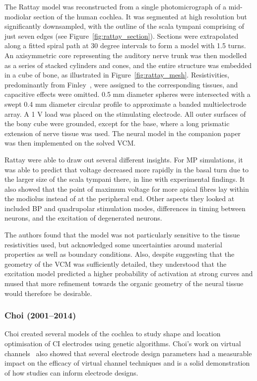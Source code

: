 The Rattay model was reconstructed from a single photomicrograph of a
mid-modiolar section of the human cochlea. It was segmented at high resolution
but significantly downsampled, with the outline of the scala tympani comprising
of just seven edges (see Figure~\ref{fig:rattay_section}). Sections were
extrapolated along a fitted spiral path at 30 degree intervals to form a model
with 1.5 turns. An axisymmetric core representing the auditory nerve trunk was
then modelled as a series of stacked cylinders and cones, and the entire
structure was embedded in a cube of bone, as illustrated in
Figure~\ref{fig:rattay_mesh}. Resistivities, predominantly from
Finley~\cite{finley1990}, were assigned to the corresponding tissues, and
capacitive effects were omitted. 0.5 mm diameter spheres were intersected with a
swept 0.4 mm diameter circular profile to approximate a banded multielectrode
array. A 1 V load was placed on the stimulating electrode. All outer surfaces of
the bony cube were grounded, except for the base, where a long prismatic
extension of nerve tissue was used. The neural model in the companion
paper~\cite{rattay2001neuron} was then implemented on the solved VCM.

Rattay \etal{} were able to draw out several different insights. For MP
simulations, it was able to predict that voltage decreased more rapidly in the
basal turn due to the larger size of the scala tympani there, in line with
experimental findings. It also showed that the point of maximum voltage for more
apical fibres lay within the modiolus instead of at the peripheral end. Other
aspects they looked at included BP and quadrupolar stimulation modes,
differences in timing between neurons, and the excitation of degenerated
neurons.

The authors found that the model was not particularly sensitive to the tissue
resistivities used, but acknowledged some uncertainties around material
properties as well as boundary conditions. Also, despite suggesting that the
geometry of the VCM was sufficiently detailed, they understood that the
excitation model predicted a higher probability of activation at strong curves
and mused that more refinement towards the organic geometry of the neural tissue
would therefore be desirable.

\subsubsection{Choi \etal{} (2001--2014)}

Choi \etal{} created several models of the cochlea to study shape and location
optimisation of CI electrodes using genetic algorithms. Choi's work on virtual
channels~\cite{choi2009} also showed that several electrode design parameters
had a measurable impact on the efficacy of virtual channel techniques and is a
solid demonstration of how \insilico{} studies can inform electrode designs.

